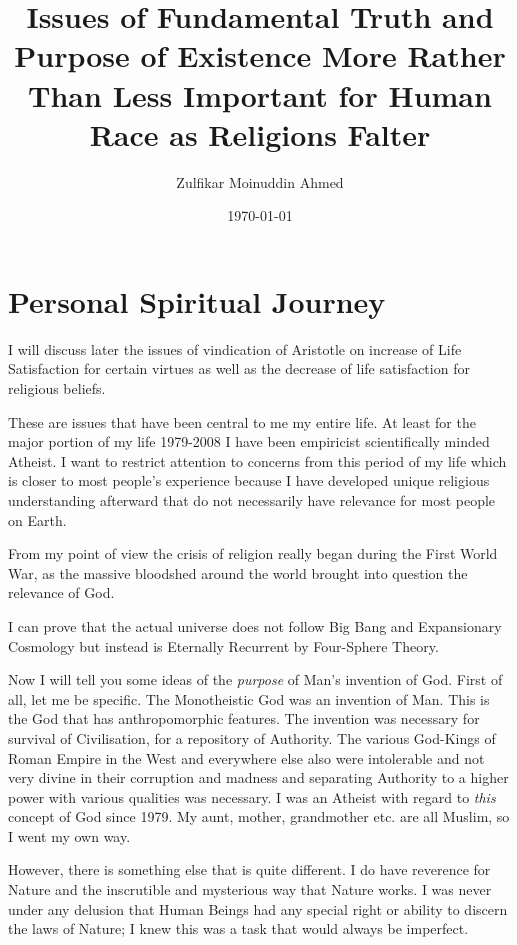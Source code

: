 \documentclass{amsart}
\title{Issues of Fundamental Truth and Purpose of Existence More Rather Than Less Important for Human Race as Religions Falter}
\author{Zulfikar Moinuddin Ahmed}
\date{\today}
\begin{document}
\maketitle

\section{Personal Spiritual Journey}

I will discuss later the issues of vindication of Aristotle on increase of Life Satisfaction for certain virtues as well as the decrease of life satisfaction for religious beliefs.

These are issues that have been central to me my entire life. At least for the major portion of my life 1979-2008 I have been empiricist scientifically minded Atheist.  I want to restrict attention to concerns from this period of my life which is closer to most people's experience because I have developed unique religious understanding afterward that do not necessarily have relevance for most people on Earth.

From my point of view the crisis of religion really began during the First World War, as the massive bloodshed around the world brought into question the relevance of God.

I can prove that the actual universe does not follow Big Bang and Expansionary Cosmology but instead is Eternally Recurrent by Four-Sphere Theory.

Now I will tell you some ideas of the {\em purpose} of Man's invention of God.  First of all, let me be specific.  The Monotheistic God was an invention of Man.  This is the God that has anthropomorphic features.  The invention was necessary for survival of Civilisation, for a repository of Authority.  The various God-Kings of Roman Empire in the West and everywhere else also were intolerable and not very divine in their corruption and madness and separating Authority to a higher power with various qualities was necessary.  I was an Atheist with regard to {\em this} concept of God since 1979.  My aunt, mother, grandmother etc. are all Muslim, so I went my own way.  

However, there is something else that is quite different.  I do have reverence for Nature and the inscrutible and mysterious way that Nature works.  I was never under any delusion that Human Beings had any special right or ability to discern the laws of Nature; I knew this was a task that would always be imperfect.
\end{document}
